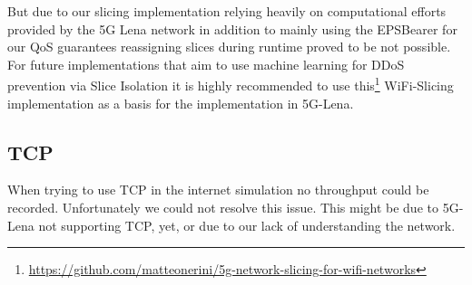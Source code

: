     But due to our slicing implementation relying heavily on computational efforts provided by the 5G Lena network in addition to mainly using the EPSBearer for our QoS guarantees reassigning slices during runtime proved to be not possible. 
    For future implementations that aim to use machine learning for DDoS prevention via Slice Isolation it is highly recommended to use this\footnote[7]{\url{https://github.com/matteonerini/5g-network-slicing-for-wifi-networks}} WiFi-Slicing implementation as a basis for the implementation in 5G-Lena.
    
    \subsection{TCP}
    When trying to use TCP in the internet simulation no throughput could be recorded. Unfortunately we could not resolve this issue. This might be due to 5G-Lena not supporting TCP, yet, or due to our lack of understanding the network.